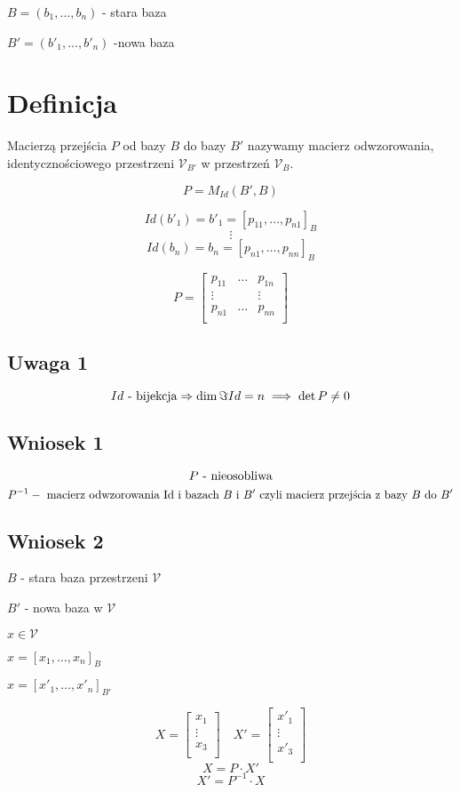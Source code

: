 \documentclass[11pt]{article}
\begin{document}
$B = (b_1,\ldots,b_n)$ - stara baza 

$B' = (b'_1 , \ldots ,b'_n ) $ -nowa baza

\section{Definicja}
Macierzą przejścia $P$ od bazy $B$ do bazy $B'$ nazywamy macierz odwzorowania, identycznościowego przestrzeni $ \mathcal{V}_{B'}$ w przestrzeń $\mathcal{V}_{B}$.

$$ P = M_{Id}(B',B) $$

$$ Id(b'_1) = b'_1 = [p_{11},\ldots,p_{n1}]_B $$
$$ \vdots $$
$$ Id(b_n) = b_n = [p_{n1}, \ldots, p_{nn}]_B $$

$$ P = \begin{bmatrix}
	p_{11} & \ldots & p_{1n}\\
	\vdots &  & \vdots \\
	p_{n1} & \ldots & p_{nn}\\
\end{bmatrix}$$

\subsection{Uwaga 1}

$$ Id \hbox{ - bijekcja} \Rightarrow  \dim{ \Im{Id}}  = n \implies \det{P} \not = 0 $$

\subsection{Wniosek 1}
 $$ P \hbox{ - nieosobliwa} $$
 $$ P^{-1} - \hbox{ macierz odwzorowania Id i bazach } B \hbox{ i } B' \hbox{ czyli macierz przejścia z  bazy } B \hbox{ do } B' $$
 
\subsection{Wniosek 2}
$B$ - stara baza przestrzeni $\mathcal{V}$ 

$B'$ - nowa baza w $\mathcal{V}$

$ x \in \mathcal{V}$

$x = [x_1,\ldots,x_n]_B$

$x = [x'_1, \ldots, x'_n]_{B'}$

$$ X = \begin{bmatrix}
	x_1\\
	\vdots\\
	x_3\\
\end{bmatrix} \quad  
X' = \begin{bmatrix}
	x'_1\\
	\vdots\\
	x'_3\\
\end{bmatrix} $$
$$ X = P \cdot X' $$
$$ X' = P^{-1} \cdot X $$ 
\end{document}
